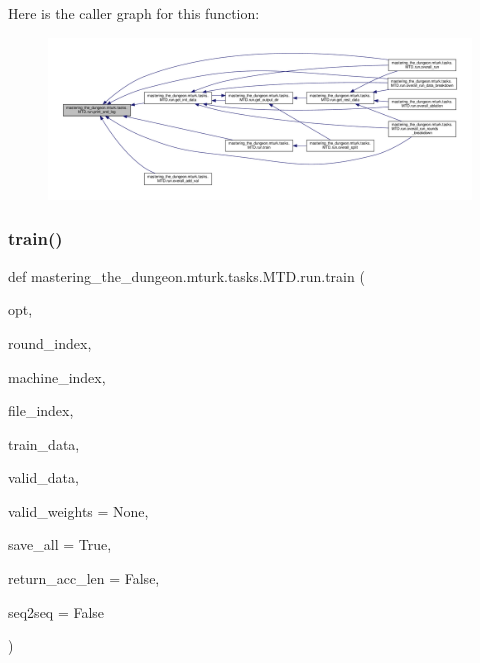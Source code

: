 Here is the caller graph for this function\+:
\nopagebreak
\begin{figure}[H]
\begin{center}
\leavevmode
\includegraphics[width=350pt]{namespacemastering__the__dungeon_1_1mturk_1_1tasks_1_1MTD_1_1run_ae9470c6f4c17df22c645c66d61556c8f_icgraph}
\end{center}
\end{figure}
\mbox{\label{namespacemastering__the__dungeon_1_1mturk_1_1tasks_1_1MTD_1_1run_ae3eef3ab364f34b11c71cf1b936afdf1}} 
\subsubsection{\texorpdfstring{train()}{train()}}
{\footnotesize\ttfamily def mastering\+\_\+the\+\_\+dungeon.\+mturk.\+tasks.\+M\+T\+D.\+run.\+train (\begin{DoxyParamCaption}\item[{}]{opt,  }\item[{}]{round\+\_\+index,  }\item[{}]{machine\+\_\+index,  }\item[{}]{file\+\_\+index,  }\item[{}]{train\+\_\+data,  }\item[{}]{valid\+\_\+data,  }\item[{}]{valid\+\_\+weights = {\ttfamily None},  }\item[{}]{save\+\_\+all = {\ttfamily True},  }\item[{}]{return\+\_\+acc\+\_\+len = {\ttfamily False},  }\item[{}]{seq2seq = {\ttfamily False} }\end{DoxyParamCaption})}



